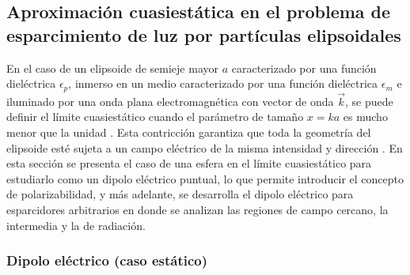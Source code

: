 \subsection{Aproximación cuasiestática en el problema de esparcimiento de luz por partículas elipsoidales}

 En el caso de un elipsoide de semieje mayor $a$ caracterizado por una función dieléctrica $\epsilon_p$, inmerso en un medio caracterizado por una función dieléctrica $\epsilon_m$ e iluminado por una onda plana electromagnética con vector de onda $\Vec{k}$, se puede definir el límite cuasiestático cuando el parámetro de tamaño $x=ka$ es mucho menor que la unidad \cite{Bohren}. Esta contricción garantiza que toda la geometría del elipsoide esté sujeta a un campo eléctrico de la misma intensidad y dirección \cite{Miguel}. En esta sección se presenta el caso de una esfera en el límite cuasiestático para estudiarlo como un dipolo eléctrico puntual, lo que permite introducir el concepto de polarizabilidad, y más adelante, se desarrolla el dipolo eléctrico para esparcidores arbitrarios en donde se analizan las regiones de campo cercano, la intermedia y la de radiación.


\subsubsection{Dipolo eléctrico (caso estático)}

